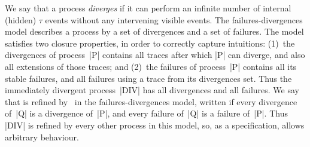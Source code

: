 We say that a process \emph{diverges} if it can perform an infinite number of
internal (hidden) $\tau$ events without any intervening visible events.  The
failures-divergences model describes a process by a set of divergences and a
set of failures.  The model satisfies two closure properties, in order to
correctly capture intuitions: (1)~the divergences of process~|P|
contains all traces after which |P| can diverge, and also all extensions of
those traces; and (2)~the failures of process~|P| contains all its stable
failures, and all failures using a trace from its divergences set.  Thus the
immediately divergent process~|DIV| has all divergences and all failures.  We
say that  is refined by~ in the failures-divergences model,
written \CSPM{P [FD= Q}
if every divergence of~|Q| is a divergence of~|P|, and every failure of~|Q| is
a failure of~|P|.  Thus |DIV| is refined by every other process in this model,
so, as a specification, allows arbitrary behaviour.






